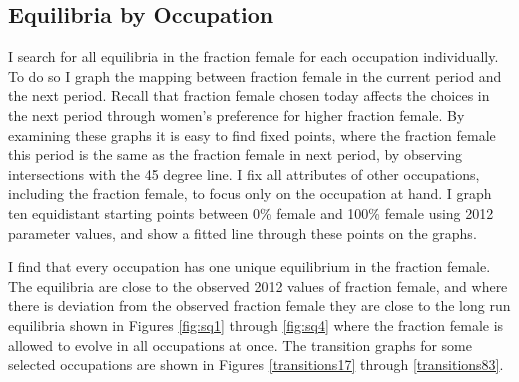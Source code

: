 \documentclass[12pt]{article}
\begin{document}

%

\subsection{Equilibria by Occupation}
I search for all equilibria in the fraction female for each occupation individually. To do so I graph the mapping between fraction female in the current period and the next period. Recall that fraction female chosen today affects the choices in the next period through women's preference for higher fraction female. By examining these graphs it is easy to find fixed points, where the fraction female this period is the same as the fraction female in next period, by observing intersections with the 45 degree line. I fix all attributes of other occupations, including the fraction female, to focus only on the occupation at hand. I graph ten equidistant starting points between 0\% female and 100\% female using 2012 parameter values, and show a fitted line through these points on the graphs.

I find that every occupation has one unique equilibrium in the fraction female. The equilibria are close to the observed 2012 values of fraction female, and where there is deviation from the observed fraction female they are close to the long run equilibria shown in Figures \ref{fig:sq1} through \ref{fig:sq4} where the fraction female is allowed to evolve in all occupations at once. The transition graphs for some selected occupations are shown in Figures \ref{transitions17} through \ref{transitions83}.


\end{document}
